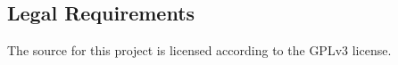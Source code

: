 \documentclass[11pt]{article} %
\begin{document}


\subsection{Legal Requirements}

The source for this project is licensed according to the GPLv3 license.








\end{document}
